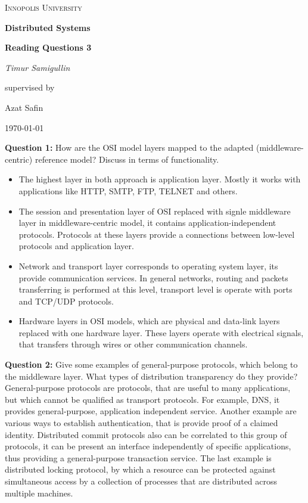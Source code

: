 \documentclass[12pt,a4paper]{report}
\begin{document}
\begin{titlepage}
	\centering
	{\scshape\LARGE Innopolis University \par}
	\vspace{1cm}
	{\huge\bfseries Distributed Systems\par}
	{\huge\bfseries Reading Questions 3\par}
	\vspace{2cm}
	{\Large\itshape Timur Samigullin\par}
	\vfill
	supervised by\par
	Azat Safin
	\vfill
	{\large \today\par}
\end{titlepage}

\textbf{Question 1:} How are the OSI model layers mapped to the adapted (middleware-centric) reference model? Discuss in terms of functionality.
\bigbreak

\begin{itemize}
	\item{The highest layer in both approach is application layer. Mostly it works with applications like HTTP, SMTP, FTP, TELNET and others.}
	\item{The session and presentation layer of OSI replaced with signle middleware layer in middleware-centric model, it contains application-independent protocols. Protocols at these layers provide a connections between low-level protocols and application layer.}
	\item{Network and transport layer corresponds to operating system layer, its provide communication services. In general networks, routing and packets transferring is performed at this level, transport level is operate with ports and TCP/UDP protocols.}
	\item{Hardware layers in OSI models, which are physical and data-link layers replaced with one hardware layer. These layers operate with electrical signals, that transfers through wires or other communication channels.}
\end{itemize}
\bigbreak

\textbf{Question 2:} Give some examples of general-purpose protocols, which belong to the middleware layer. What types of distribution transparency do they provide?
\bigbreak
General-purpose protocols are protocols, that are useful to many applications, but which cannot be qualified as transport protocols. For example, DNS, it provides general-purpose, application independent service. Another example are various ways to establish authentication, that is provide proof of a claimed identity. Distributed commit protocols also can be correlated to this group of protocols, it can be present an interface independently of specific applications, thus providing a general-purpose transaction service. The last example is distributed locking protocol, by which a resource can be protected against simultaneous access by a collection of processes that are distributed across multiple machines. 
\end{document}

